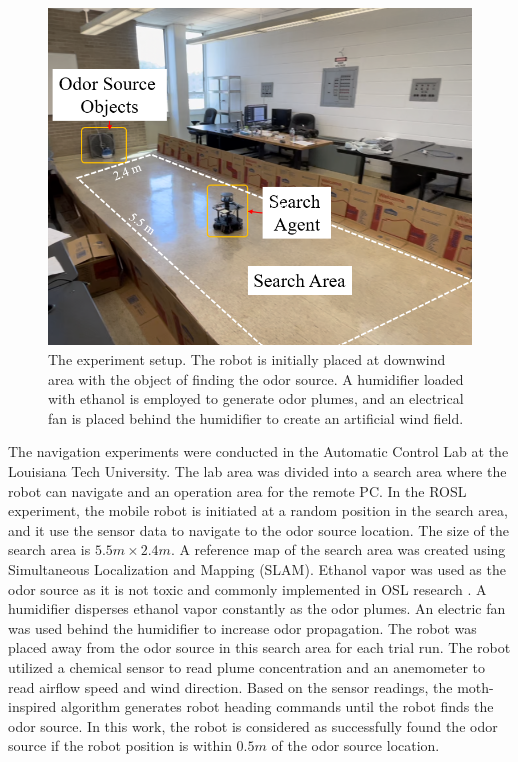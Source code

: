 \begin{figure}[h] %

\ \\
\vspace*{-.18in}

\begin{center}
\includegraphics[width=0.9\columnwidth]{Main/Figure/olfaction_SearchArea.png}\hspace*{0.04in}
\end{center}
\vspace{-.1in}

\caption
{The experiment setup. The robot is initially placed at downwind area with the object of finding the odor source. A humidifier loaded with ethanol is employed to generate odor plumes, and an electrical fan is placed behind the humidifier to create an artificial wind field.}
\label{fig:olfaction_experimentSetup}
\end{figure}

The navigation experiments were conducted in the Automatic Control Lab at the Louisiana Tech University. The lab area was divided into a search area where the robot can navigate and an operation area for the remote PC. In the ROSL experiment, the mobile robot is initiated at a random position in the search area, and it use the sensor data to navigate to the odor source location. The size of the search area is $5.5 m\times2.4m$. A reference map of the search area was created using Simultaneous Localization and Mapping (SLAM). 
Ethanol vapor was used as the odor source as it is not toxic and commonly implemented in OSL research \cite{feng2019experimental}. A humidifier disperses ethanol vapor constantly as the odor plumes. An electric fan was used behind the humidifier to increase odor propagation. The robot was placed away from the odor source in this search area for each trial run. The robot utilized a chemical sensor to read plume concentration and an anemometer to read airflow speed and wind direction. Based on the sensor readings, the moth-inspired algorithm generates robot heading commands until the robot finds the odor source. In this work, the robot is considered as successfully found the odor source if the robot position is within $0.5 m$ of the odor source location.

